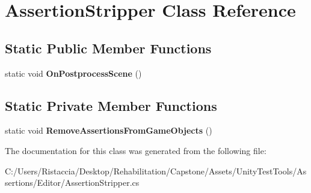 \hypertarget{class_assertion_stripper}{}\section{Assertion\+Stripper Class Reference}
\label{class_assertion_stripper}
\subsection*{Static Public Member Functions}
\begin{DoxyCompactItemize}
\item 
\mbox{\label{class_assertion_stripper_a88f65be0408bd995f2368a33c922e981}} 
static void {\bfseries On\+Postprocess\+Scene} ()
\end{DoxyCompactItemize}
\subsection*{Static Private Member Functions}
\begin{DoxyCompactItemize}
\item 
\mbox{\label{class_assertion_stripper_a5cde5a7e12729f566017a1c825d389a0}} 
static void {\bfseries Remove\+Assertions\+From\+Game\+Objects} ()
\end{DoxyCompactItemize}


The documentation for this class was generated from the following file\+:\begin{DoxyCompactItemize}
\item 
C\+:/\+Users/\+Ristaccia/\+Desktop/\+Rehabilitation/\+Capstone/\+Assets/\+Unity\+Test\+Tools/\+Assertions/\+Editor/Assertion\+Stripper.\+cs\end{DoxyCompactItemize}

